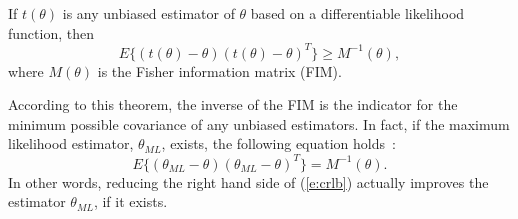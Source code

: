 

\begin{thm}
If $t(\theta)$ is any unbiased estimator of $\theta$ based on a differentiable likelihood function, then
\begin{equation} \label{e:crlb}
    E\{(t(\theta)-\theta) (t(\theta)-\theta)^T\} \geq M^{-1}(\theta),
\end{equation}
where $M(\theta)$ is the Fisher information matrix (FIM).
\end{thm}
\begin{remark}
According to this theorem, the inverse of the FIM is the indicator for the minimum possible covariance of any unbiased estimators. In fact, if the maximum likelihood estimator, $\theta_{ML}$, exists, the following equation holds~\cite{EmeryOED98}:
$$E\{(\theta_{ML}-\theta)(\theta_{ML}-\theta)^T\}=M^{-1}(\theta). $$
In other words, reducing the right hand side of (\ref{e:crlb}) actually improves the estimator $\theta_{ML}$, if it exists.
\end{remark}




